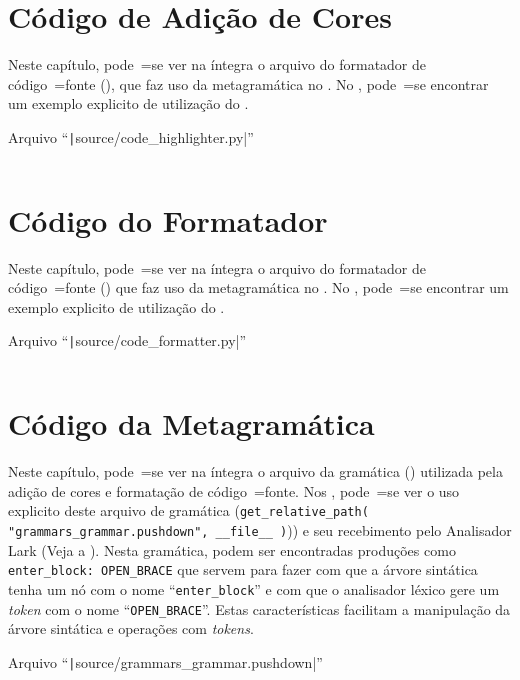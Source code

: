 \chapter{Código de Adição de Cores}

Neste capítulo,
pode~=se ver na íntegra o arquivo do formatador de código~=fonte (),
que faz uso da metagramática no .
No ,
pode~=se encontrar um exemplo explicito de utilização do .
\begin{code}
\caption{Arquivo ``\texttt|source/code_highlighter.py|''}
\label{code:codeHighlighterPy}
\inputminted[firstline=39,firstnumber=1]{python3}{../source/code_highlighter.py}
\end{code}


\chapter{Código do Formatador}
\label{chapter:codigoDoFormatador}

Neste capítulo,
pode~=se ver na íntegra o arquivo do formatador de código~=fonte () que faz uso da metagramática no .
No ,
pode~=se encontrar um exemplo explicito de utilização do .
\begin{code}
\caption{Arquivo ``\texttt|source/code_formatter.py|''}
\label{code:codeFormatterPy}
\inputminted[firstline=39,firstnumber=1]{python3}{../source/code_formatter.py}
\end{code}


\chapter{Código da Metagramática}
\label{chapter:codigoDaMetagramatica}

Neste capítulo,
pode~=se ver na íntegra o arquivo da gramática () utilizada pela adição de cores e
formatação de código~=fonte.
Nos ,
pode~=se ver o uso explicito deste arquivo de gramática (\texttt{get_relative_path( "grammars_grammar.pushdown",
__file__ )})) e
seu recebimento pelo Analisador Lark (Veja a ).
Nesta gramática,
podem ser encontradas produções como \texttt{enter_block:
OPEN_BRACE} que servem para fazer com que a árvore sintática tenha um nó com o nome ``\texttt{enter_block}'' e
com que o analisador léxico gere um \textit{token} com o nome ``\texttt{OPEN_BRACE}''.
Estas características facilitam a manipulação da árvore sintática e
operações com \textit{tokens}.
\begin{code}
\caption{Arquivo ``\texttt|source/grammars_grammar.pushdown|''}
\label{code:grammarsGrammarPushdown}
\inputminted[firstline=39,firstnumber=1]{antlr}{../source/grammars_grammar.pushdown}
\end{code}
